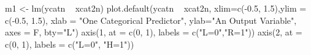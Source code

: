 \begin{Schunk}
\begin{Sinput}
 m1 <- lm(ycatn ~ xcat2n)
 plot.default(ycatn ~ xcat2n, xlim=c(-0.5, 1.5),ylim = c(-0.5, 1.5), xlab = "One Categorical Predictor", ylab="An Output Variable", axes = F, bty="L")
 axis(1, at = c(0, 1), labels = c("L=0","R=1"))
 axis(2, at = c(0, 1), labels = c("L=0", "H=1"))
\end{Sinput}
\end{Schunk}
